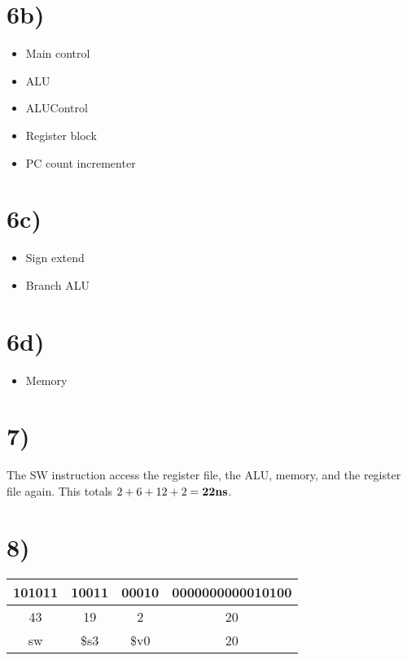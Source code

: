 \documentclass[a4paper,11pt]{article}
\begin{document}
\section*{6b)}
\begin{itemize}
  \item Main control
  \item ALU 
  \item ALUControl
  \item Register block
  \item PC count incrementer
\end{itemize}

\section*{6c)}
\begin{itemize}
  \item Sign extend
  \item Branch ALU
\end{itemize}

\section*{6d)}
\begin{itemize}
  \item Memory
\end{itemize}



\section*{7)}
The SW instruction access the register file, the ALU, memory, and the register file again.  This totals $2 + 6 + 12 + 2 = {\bf 22ns}$.


\section*{8)}
\begin{tabular}{| c | c | c | c |}
  \hline	
       101011 & 10011 & 00010 & 0000000000010100 \\  \hline
       43 & 19 & 2 & 20 \\  \hline
       sw & \$s3 & \$v0 & 20 \\  \hline
\end{tabular} \\
\end{document}
